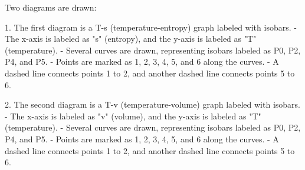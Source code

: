 Two diagrams are drawn:  

1. The first diagram is a T-s (temperature-entropy) graph labeled with isobars.  
   - The x-axis is labeled as "s" (entropy), and the y-axis is labeled as "T" (temperature).  
   - Several curves are drawn, representing isobars labeled as P0, P2, P4, and P5.  
   - Points are marked as 1, 2, 3, 4, 5, and 6 along the curves.  
   - A dashed line connects points 1 to 2, and another dashed line connects points 5 to 6.  

2. The second diagram is a T-v (temperature-volume) graph labeled with isobars.  
   - The x-axis is labeled as "v" (volume), and the y-axis is labeled as "T" (temperature).  
   - Several curves are drawn, representing isobars labeled as P0, P2, P4, and P5.  
   - Points are marked as 1, 2, 3, 4, 5, and 6 along the curves.  
   - A dashed line connects points 1 to 2, and another dashed line connects points 5 to 6.
